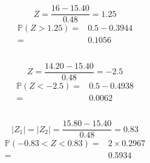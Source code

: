 \documentclass{article}
\begin{document}
    \section{}
        \subsection{}
            $$Z=\frac{16-15.40}{0.48}=1.25$$ 
            \begin{equation*}
                \begin{split}
                    \mathbb{P}(Z>1.25)=&0.5-0.3944\\
                        =&0.1056
                \end{split}
            \end{equation*}
        \subsection{}
            $$Z=\frac{14.20-15.40}{0.48}=-2.5$$ 
            \begin{equation*}
                \begin{split}
                    \mathbb{P}(Z<-2.5)=&0.5-0.4938\\
                        =&0.0062
                \end{split}
            \end{equation*}
        \subsection{}
            $$|Z_1|=|Z_2|=\frac{15.80-15.40}{0.48}=0.83$$ 
            \begin{equation*}
                \begin{split}
                    \mathbb{P}(-0.83<Z<0.83)=&2\times 0.2967\\
                        =&0.5934
                \end{split}
            \end{equation*}
\end{document}
